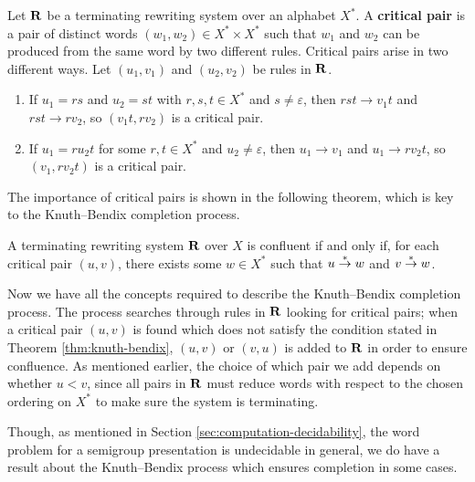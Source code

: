 \begin{definition}
  \label{def:critical-pair}
  Let $\mathbf{R}$ be a terminating rewriting system over an alphabet $X^*$.  A
  \textbf{critical pair} is a pair of distinct words
  $(w_1, w_2) \in X^* \times X^*$ such that $w_1$ and $w_2$ can be produced from
  the same word by two different rules.
  Critical pairs arise in two different ways.
  Let $(u_1, v_1)$ and $(u_2, v_2)$ be rules in $\mathbf{R}$.
  \begin{enumerate}[\rm(i)]
  \item If $u_1 = rs$ and $u_2 = st$ with $r,s,t \in X^*$ and
    $s \neq \varepsilon$, then $rst \to v_1t$ and $rst \to rv_2$, so
    $(v_1t, rv_2)$ is a critical pair.
  \item If $u_1 = ru_2t$ for some $r,t \in X^*$ and $u_2 \neq \varepsilon$, then
    $u_1 \to v_1$ and $u_1 \to rv_2t$, so $(v_1, rv_2t)$ is a critical
    pair.
  \end{enumerate}
\end{definition}

The importance of critical pairs is shown in the following theorem, which is key
to the Knuth--Bendix completion process.

\begin{theorem}
  \label{thm:knuth-bendix}
  A terminating rewriting system $\mathbf{R}$ over $X$ is confluent if and only if,
  for each critical pair $(u, v)$, there exists some $w \in X^*$ such that
  $u \stackrel{*}{\to} w$ and $v \stackrel{*}{\to} w$.
\end{theorem}

Now we have all the concepts required to describe the Knuth--Bendix completion
process.  The process searches through rules in $\mathbf{R}$ looking for critical
pairs; when a critical pair $(u, v)$ is found which does not satisfy the
condition stated in Theorem \ref{thm:knuth-bendix}, $(u, v)$ or $(v, u)$ is
added to $\mathbf{R}$ in order to ensure confluence.  As mentioned earlier, the choice
of which pair we add depends on
whether $u < v$, since all pairs in $\mathbf{R}$ must reduce words with respect to the
chosen ordering on $X^*$ to make sure the system is terminating.

Though, as mentioned in Section \ref{sec:computation-decidability}, the word problem for a
semigroup presentation is undecidable in general, we do have a result about the
Knuth--Bendix process which ensures completion in some cases.


